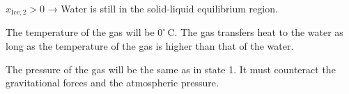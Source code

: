 \( x_{\text{Ice},2} > 0 \) → Water is still in the solid-liquid equilibrium region.  

The temperature of the gas will be \( 0^\circ \, \text{C} \). The gas transfers heat to the water as long as the temperature of the gas is higher than that of the water.  

The pressure of the gas will be the same as in state 1. It must counteract the gravitational forces and the atmospheric pressure.